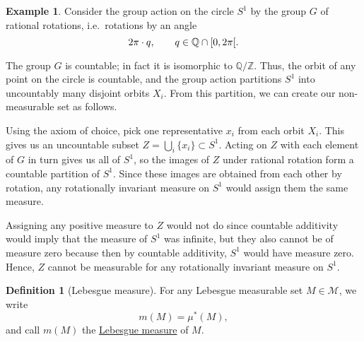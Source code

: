 \documentclass[a4paper]{scrartcl}
\newcommand{\Z}{\mathbb{Z}}
\newcommand{\Q}{\mathbb{Q}}
\newcommand{\defn}[1]{\ul{#1}}
\theoremstyle{definition}
\newtheorem{definition}{Definition}[section]
\newtheorem{example}{Example}[section]
\theoremstyle{plain}
\theoremstyle{remark}
\begin{document}
\begin{example}
  Consider the group action on the circle $S^{1}$ by the group $G$ of rational rotations, i.e.\ rotations by an angle
  \begin{equation*}
    2\pi \cdot q,\qquad q \in \Q \cap \interval[open right]{0}{2\pi}.
  \end{equation*}

  The group $G$ is countable; in fact it is isomorphic to $\Q/\Z$. Thus, the orbit of any point on the circle is countable, and the group action partitions $S^{1}$ into uncountably many disjoint orbits $X_{i}$. From this partition, we can create our non-measurable set as follows.

  Using the axiom of choice, pick one representative $x_{i}$ from each orbit $X_{i}$. This gives us an uncountable subset $Z = \bigcup_{i} \{ x_{i} \} \subset S^{1}$. Acting on $Z$ with each element of $G$ in turn gives us all of $S^{1}$, so the images of $Z$ under rational rotation form a countable partition of $S^{1}$. Since these images are obtained from each other by rotation, any rotationally invariant measure on $S^{1}$ would assign them the same measure.

  Assigning any positive measure to $Z$ would not do since countable additivity would imply that the measure of $S^{1}$ was infinite, but they also cannot be of measure zero because then by countable additivity, $S^{1}$ would have measure zero. Hence, $Z$ cannot be measurable for any rotationally invariant measure on $S^{1}$.
\end{example}

\begin{definition}[Lebesgue measure]
  \label{def:lebesguemeasure}
  For any Lebesgue measurable set $M \in \mathcal{M}$, we write
  \begin{equation*}
    m(M) = \mu^{*}(M),
  \end{equation*}
  and call $m(M)$ the \defn{Lebesgue measure} of $M$.
\end{definition}
\end{document}
